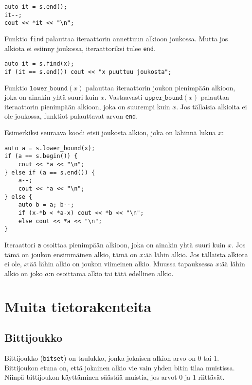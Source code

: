 \begin{lstlisting}
auto it = s.end();
it--;
cout << *it << "\n";
\end{lstlisting}

Funktio \texttt{find} palauttaa iteraattorin
annettuun alkioon joukossa.
Mutta jos alkiota ei esiinny joukossa,
iteraattoriksi tulee \texttt{end}.

\begin{lstlisting}
auto it = s.find(x);
if (it == s.end()) cout << "x puuttuu joukosta";
\end{lstlisting}

Funktio $\texttt{lower\_bound}(x)$ palauttaa
iteraattorin joukon pienimpään alkioon,
joka on ainakin yhtä suuri kuin $x$.
Vastaavasti $\texttt{upper\_bound}(x)$ palauttaa
iteraattorin pienimpään alkioon,
joka on suurempi kuin $x$.
Jos tällaisia alkioita ei ole joukossa,
funktiot palauttavat arvon \texttt{end}.

Esimerkiksi seuraava koodi etsii joukosta
alkion, joka on lähinnä lukua $x$:

\begin{lstlisting}
auto a = s.lower_bound(x);
if (a == s.begin()) {
    cout << *a << "\n";
} else if (a == s.end()) {
    a--;
    cout << *a << "\n";
} else {
    auto b = a; b--;
    if (x-*b < *a-x) cout << *b << "\n";
    else cout << *a << "\n";
}
\end{lstlisting}
Iteraattori \texttt{a}
osoittaa pienimpään alkioon,
joka on ainakin yhtä suuri kuin $x$.
Jos tämä on joukon ensimmäinen alkio,
tämä on $x$:ää lähin alkio.
Jos tällaista alkiota ei ole,
$x$:ää lähin alkio on joukon viimeinen alkio.
Muussa tapauksessa $x$:ää lähin alkio
on joko $a$:n osoittama alkio tai tätä edellinen alkio.

\section{Muita tietorakenteita}

\subsection{Bittijoukko}

Bittijoukko (\texttt{bitset}) on taulukko,
jonka jokaisen alkion arvo on 0 tai 1.
Bittijoukon etuna on, että jokainen alkio
vie vain yhden bitin tilaa muistissa.
Niinpä bittijoukon käyttäminen säästää muistia,
jos arvot 0 ja 1 riittävät.


